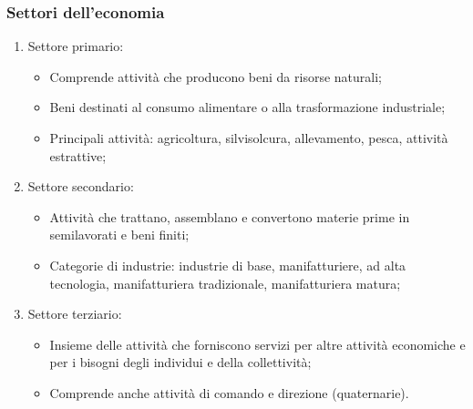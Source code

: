 \documentclass{article}
\begin{document}
\subsubsection{Settori dell'economia}
\begin{enumerate}
    \item Settore primario:
        \begin{itemize}
            \item Comprende attività che producono beni da risorse naturali;
            \item Beni destinati al consumo alimentare o alla trasformazione industriale;
            \item Principali attività: agricoltura, silvisolcura, allevamento, pesca, attività
                estrattive;
        \end{itemize}
    \item Settore secondario:
        \begin{itemize}
            \item Attività che trattano, assemblano e convertono materie prime in semilavorati e
                beni finiti;
            \item Categorie di industrie: industrie di base, manifatturiere, ad alta tecnologia,
                manifatturiera tradizionale, manifatturiera matura;
        \end{itemize}
    \item Settore terziario:
        \begin{itemize}
            \item Insieme delle attività che forniscono servizi per altre attività economiche
                e per i bisogni degli individui e della collettività;
            \item Comprende anche attività di comando e direzione (quaternarie).
        \end{itemize}
\end{enumerate}
\end{document}
